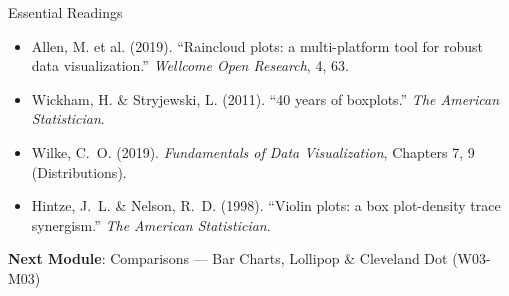 \documentclass[10pt]{beamer}
\begin{document}
\begin{frame}{Essential Readings}
  \begin{itemize}
    \item Allen, M. et al. (2019). ``Raincloud plots: a multi-platform tool
          for robust data visualization.'' \emph{Wellcome Open Research}, 4, 63.
    \item Wickham, H. \& Stryjewski, L. (2011). ``40 years of boxplots.''
          \emph{The American Statistician}.
    \item Wilke, C.~O. (2019). \emph{Fundamentals of Data Visualization},
          Chapters 7, 9 (Distributions).
    \item Hintze, J.~L. \& Nelson, R.~D. (1998). ``Violin plots: a box
          plot-density trace synergism.'' \emph{The American Statistician}.
  \end{itemize}
  \vspace{6pt}
  \textbf{Next Module}: Comparisons --- Bar Charts, Lollipop \& Cleveland Dot (W03-M03)
\end{frame}
\end{document}
